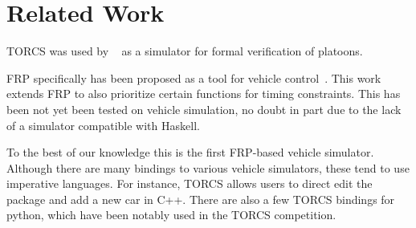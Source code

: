 \section{Related Work}

TORCS was used by ~\cite{kamali2016formal} as a simulator for formal verification of platoons.


FRP specifically has been proposed as a tool for vehicle control~\cite{kazemi2016,zou2016}.
This work extends FRP to also prioritize certain functions for timing constraints.
This has been not yet been tested on vehicle simulation, no doubt in part due to the lack of a simulator compatible with Haskell.

To the best of our knowledge this is the first FRP-based vehicle simulator.
Although there are many bindings to various vehicle simulators, these tend to use imperative languages.
For instance, TORCS allows users to direct edit the package and add a new car in C++.
There are also a few TORCS bindings for python, which have been notably used in the TORCS competition.
